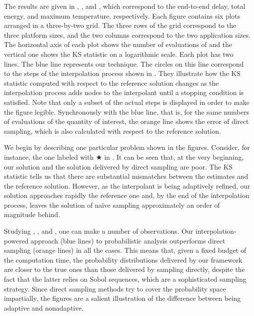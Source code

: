 The results are given in ,
, and , which
correspond to the end-to-end delay, total energy, and maximum temperature,
respectively. Each figure contains six plots arranged in a three-by-two grid.
The three rows of the grid correspond to the three platform sizes, and the two
columns correspond to the two application sizes. The horizontal axis of each
plot shows the number of evaluations of \g and the vertical one shows the
\ac{KS} statistic on a logarithmic scale. Each plot has two lines. The blue line
represents our technique. The circles on this line correspond to the steps of
the interpolation process shown in . They illustrate how the
\ac{KS} statistic computed with respect to the reference solution changes as the
interpolation process adds nodes to the interpolant until a stopping condition
is satisfied. Note that only a subset of the actual steps is displayed in order
to make the figure legible. Synchronously with the blue line, that is, for the
same numbers of evaluations of the quantity of interest, the orange line shows
the error of direct sampling, which is also calculated with respect to the
reference solution.

We begin by describing one particular problem shown in the figures. Consider,
for instance, the one labeled with $\bigstar$ in .
It can be seen that, at the very beginning, our solution and the solution
delivered by direct sampling are poor. The \ac{KS} statistic tells us that there
are substantial mismatches between the estimates and the reference solution.
However, as the interpolant is being adaptively refined, our solution approaches
rapidly the reference one and, by the end of the interpolation process, leaves
the solution of naïve sampling approximately an order of magnitude behind.

Studying , , and
, one can make a number of observations. Our
interpolation-powered approach (blue lines) to probabilistic analysis
outperforms direct sampling (orange lines) in all the cases. This means that,
given a fixed budget of the computation time, the probability distributions
delivered by our framework are closer to the true ones than those delivered by
sampling \g directly, despite the fact that the latter relies on Sobol
sequences, which are a sophisticated sampling strategy. Since direct sampling
methods try to cover the probability space impartially, the figures are a
salient illustration of the difference between being adaptive and nonadaptive.

